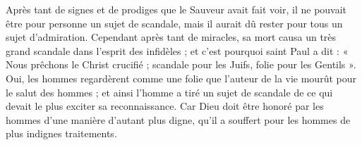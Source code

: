 Après tant de signes et de prodiges que le Sauveur avait fait voir, il ne pouvait être pour personne un sujet de scandale, mais il aurait dû rester pour tous un sujet d’admiration. Cependant après tant de miracles, sa mort causa un très grand scandale dans l’esprit des infidèles ; et c’est pourquoi saint Paul a dit : « Nous prêchons le Christ crucifié ; scandale pour les Juifs, folie pour les Gentils ». Oui, les hommes regardèrent comme une folie que l’auteur de la vie mourût pour le salut des hommes ; et ainsi l’homme a tiré un sujet de scandale de ce qui devait le plus exciter sa reconnaissance. Car Dieu doit être honoré par les hommes d’une manière d’autant plus digne, qu’il a souffert pour les hommes de plus indignes traitements.